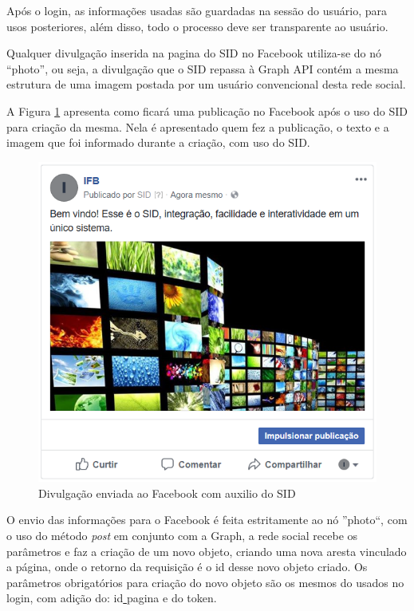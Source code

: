 Após o login, as informações usadas são guardadas na sessão do usuário, para usos posteriores, além disso, todo o processo deve ser transparente ao usuário. 

Qualquer divulgação inserida na pagina do SID no Facebook utiliza-se do nó “photo”, ou seja, a divulgação que o SID repassa à Graph API contém a mesma estrutura de uma imagem postada por um usuário convencional desta rede social. 

A Figura \ref{fig:imgfacebook1} apresenta como ficará uma publicação no Facebook após o uso do SID para criação da mesma. Nela é apresentado quem fez a publicação, o texto e a imagem que foi informado durante a criação, com uso do SID.

\begin{figure}[H]
\centering
\includegraphics[scale=1]{figuras/imgfacebook1}
\caption{Divulgação enviada ao Facebook com auxilio do SID}
\label{fig:imgfacebook1}
\end{figure}

O envio das informações para o Facebook é feita estritamente ao nó ''photo``, com o uso do método \textit{post} em conjunto com a Graph, a rede social recebe os parâmetros e faz a criação de um novo objeto, criando uma nova aresta vinculado a página, onde o retorno da requisição é o id desse novo objeto criado. Os parâmetros obrigatórios para criação do novo objeto são os mesmos do usados no login, com adição do: id\underline{{ }}pagina e do token. 


